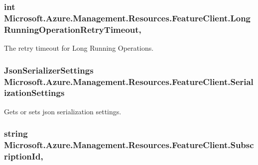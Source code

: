 \subsubsection[{\texorpdfstring{Long\+Running\+Operation\+Retry\+Timeout}{LongRunningOperationRetryTimeout}}]{\setlength{\rightskip}{0pt plus 5cm}int Microsoft.\+Azure.\+Management.\+Resources.\+Feature\+Client.\+Long\+Running\+Operation\+Retry\+Timeout\hspace{0.3cm}{\ttfamily [get]}, {\ttfamily [set]}}\hypertarget{class_microsoft_1_1_azure_1_1_management_1_1_resources_1_1_feature_client_ad5ff8d180c179578f08ed658d4134d56}{}\label{class_microsoft_1_1_azure_1_1_management_1_1_resources_1_1_feature_client_ad5ff8d180c179578f08ed658d4134d56}


The retry timeout for Long Running Operations. 

\subsubsection[{\texorpdfstring{Serialization\+Settings}{SerializationSettings}}]{\setlength{\rightskip}{0pt plus 5cm}Json\+Serializer\+Settings Microsoft.\+Azure.\+Management.\+Resources.\+Feature\+Client.\+Serialization\+Settings\hspace{0.3cm}{\ttfamily [get]}}\hypertarget{class_microsoft_1_1_azure_1_1_management_1_1_resources_1_1_feature_client_a979dfa652c2df74dc167dc45ebe35e21}{}\label{class_microsoft_1_1_azure_1_1_management_1_1_resources_1_1_feature_client_a979dfa652c2df74dc167dc45ebe35e21}


Gets or sets json serialization settings. 

\subsubsection[{\texorpdfstring{Subscription\+Id}{SubscriptionId}}]{\setlength{\rightskip}{0pt plus 5cm}string Microsoft.\+Azure.\+Management.\+Resources.\+Feature\+Client.\+Subscription\+Id\hspace{0.3cm}{\ttfamily [get]}, {\ttfamily [set]}}\hypertarget{class_microsoft_1_1_azure_1_1_management_1_1_resources_1_1_feature_client_a813f243553200ffdf6a8c6fd77196a8c}{}\label{class_microsoft_1_1_azure_1_1_management_1_1_resources_1_1_feature_client_a813f243553200ffdf6a8c6fd77196a8c}


